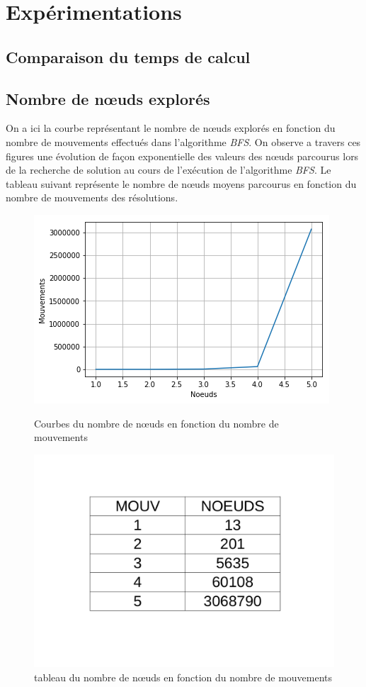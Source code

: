 \documentclass[a4paper]{article} %
\begin{document}
\section{Expérimentations}
	\subsection{Comparaison du temps de calcul}
	\subsection{Nombre de nœuds explorés}
On a ici la courbe représentant le nombre de nœuds explorés en fonction du nombre de mouvements effectués dans l'algorithme \textsl{BFS}. On observe a travers ces figures une évolution de façon exponentielle des valeurs des nœuds parcourus lors de la recherche de solution au cours de l’exécution de l'algorithme \textsl{BFS}. Le tableau suivant représente le nombre de nœuds moyens parcourus en fonction du nombre de mouvements des résolutions.

\begin{figure}[h]
	\begin{center}
	\includegraphics[scale=0.36]{./images/nodeBFS.png}
	\caption{Courbes du nombre de nœuds en fonction du  nombre de mouvements}
	\end{center}
	\begin{center}
	\includegraphics[scale=0.14]{./images/tabBFS.png}
	\caption{tableau du nombre de nœuds en fonction du  nombre de mouvements}
	\end{center}
\end{figure}
\end{document}
